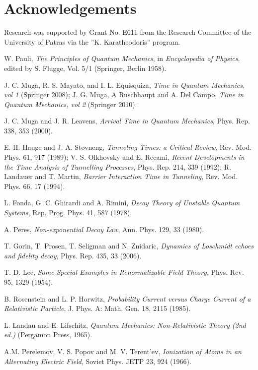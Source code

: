 \documentclass[12pt]{article}
\numberwithin{equation}{section}
\begin{document}
\section*{Acknowledgements}
Research was supported by Grant No. E611 from the Research Committee of the University of Patras via the ”K. Karatheodoris” program.
 \begin{thebibliography}{}

  W. Pauli, {\em The Principles of Quantum Mechanics}, in {\em Encyclopedia of Physics}, edited
by S. Flugge, Vol. 5/1 (Springer, Berlin 1958).

  J. C. Muga, R. S. Mayato, and I. L. Equisquiza, {\em Time in Quantum Mechanics, vol 1} (Springer 2008); J. G. Muga, A Ruschhaupt and A. Del Campo, {\em Time in Quantum
     Mechanics, vol 2} (Springer 2010).

 J. C. Muga and J. R. Leavens, {\em Arrival Time in Quantum Mechanics}, Phys. Rep. 338, 353 (2000).

 E. H. Hauge and J. A. Støvneng, {\em Tunneling Times: a Critical Review}, Rev. Mod. Phys. 61, 917 (1989); V. S.
Olkhovsky and E. Recami, {\em Recent Developments in the Time Analysis of Tunnelling Processes}, Phys. Rep. 214, 339 (1992); R. Landauer and
T. Martin, {\em Barrier Interaction Time in Tunneling},  Rev. Mod. Phys. 66, 17 (1994).



 L. Fonda, G. C. Ghirardi and A. Rimini, {\em Decay Theory of Unstable Quantum Systems}, Rep. Prog. Phys. 41, 587 (1978).

 A. Peres, {\em Non-exponential Decay Law}, Ann. Phys. 129, 33 (1980).

 T. Gorin, T. Prosen, T. Seligman and N. Znidaric, {\em Dynamics of Loschmidt echoes and fidelity decay}, Phys. Rep. 435, 33 (2006).

   T. D. Lee, {\em Some Special Examples in Renormalizable Field Theory}, Phys. Rev.
95, 1329
(1954).

  B.  Rosenstein and L.  P. Horwitz, {\em Probability Current versus Charge Current of a Relativistic Particle}, J. Phys. A: Math. Gen. 18, 2115 (1985).

   L. Landau and E. Lifschitz,  {\em Quantum Mechanics: Non-Relativistic Theory  (2nd ed.)} (Pergamon Press, 1965).

      A.M. Perelemov, V. S. Popov  and M. V. Terent'ev, {\em Ionization of Atoms in an Alternating Electric Field},  Soviet Phys. JETP  23, 924 (1966).


\end{thebibliography}
\end{document}
